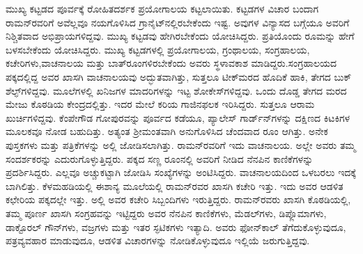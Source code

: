 ಮುಖ್ಯ ಕಟ್ಟಡದ ಪೂರ್ವಕ್ಕೆ ರೋಹಿತದರ್ಶಕ ಪ್ರಯೋಗಾಲಯ ಕಟ್ಟಲಾಯಿತು. ಕಟ್ಟಡಗಳ ವಿಚಾರ ಬಂದಾಗ ರಾಮನ್‍ರವರಿಗೆ ಅವೆಲ್ಲವೂ ನಯಗೊಳಿಸಿದ ಗ್ರಾನೈಟ್‍ನಲ್ಲಿರಬೇಕೆಂದು ಇಷ್ಟ. ಅವುಗಳ ವಿನ್ಯಾಸದ ಬಗ್ಗೆಯೂ ಅವರಿಗೆ ನಿಶ್ಚಿತವಾದ ಅಭಿಪ್ರಾಯಗಳಿದ್ದವು. ಮುಖ್ಯ ಕಟ್ಟಡವು ಹೇಗಿರಬೇಕೆಂದು ಯೋಚಿಸಿದ್ದರು. ಪ್ರತಿಯೊಂದು ರೂಮನ್ನು ಹೇಗೆ ಬಳಸಬೇಕೆಂದು ಯೋಚಿಸಿದ್ದರು. ಮುಖ್ಯ ಕಟ್ಟಡಗಳಲ್ಲಿ ಪ್ರಯೋಗಾಲಯ, ಗ್ರಂಥಾಲಯ, ಸಂಗ್ರಹಾಲಯ, ಕಚೇರಿಗಳು,\break ವಾಚನಾಲಯ ಮತ್ತು ಬಾತ್‍ರೂಂಗಳಿರಬೇಕೆಂದು ಅವರು ಸ್ಥಳಾವಕಾಶ ಮಾಡಿದ್ದರು.\break ಸಂಗ್ರಹಾಲಯದ ಪಕ್ಕದಲ್ಲಿದ್ದ ಅವರ ಖಾಸಗಿ ವಾಚನಾಲಯವು ಅದ್ಭುತವಾಗಿತ್ತು, ಸುತ್ತಲೂ ಟೀಕ್\-‍ಮರದ ಹೊದಿಕೆ ಹಾಕಿ, ತೇಗದ ಬುಕ್ ಶೆಲ್ಫ್‌ಗಳಿದ್ದವು. ಮೂಲೆಗಳಲ್ಲಿ ಖನಿಜಗಳ ಮಾದರಿಗಳನ್ನು ಇಟ್ಟ ಶೋಕೇಸ್‍ಗಳಿದ್ದವು. ಒಂದು ದೊಡ್ಡ ತೇಗದ ಮರದ ಮೇಜು ಕೊಠಡಿಯ ಕೇಂದ್ರದಲ್ಲಿತ್ತು. ಇದರ ಮೇಲೆ ಕರಿಯ ಗಾಜಿನಫಲಕ ಇರಿಸಿದ್ದರು. ಸುತ್ತಲೂ ಆರಾಮ ಖುರ್ಚಿಗಳಿದ್ದವು. ಕೆಂಪೇಗೌಡ ಗೋಪುರವನ್ನು ಪೂರ್ವದ ಕಡೆಯೂ, ಪ್ಯಾಲೇಸ್ ಗಾರ್ಡ್‌ನ್‍ಗಳನ್ನು ದಕ್ಷಿಣದ ಕಿಟಕಿಗಳ ಮೂಲಕವೂ ನೋಡ ಬಹುದಿತ್ತು. ಅತ್ಯಂತ ಶ‍್ರೀಮಂತವಾಗಿ ಅನುಗೊಳಿಸಿದ ಚೆಂದವಾದ ರೂಂ ಆಗಿತ್ತು. ಅನೇಕ ಪುಸ್ತಕಗಳು ಮತ್ತು ಪತ್ರಿಕೆಗಳನ್ನು ಅಲ್ಲಿ ಜೋಡಿಸಲಾಗಿತ್ತು. ರಾಮನ್‍ರವರಿಗೆ ಇದು ವಾಚನಾಲಯ. ಅಲ್ಲೇ ಅವರು ತಮ್ಮ ಸಂದರ್ಶಕರನ್ನು ಎದುರುಗೊಳ್ಳುತ್ತಿದ್ದರು. ಪಕ್ಕದ ಸಣ್ಣ ರೂಂನಲ್ಲಿ ಅವರಿಗೆ ನೀಡಿದ ನೆನಪಿನ ಕಾಣಿಕೆಗಳನ್ನು ಪ್ರದರ್ಶಿಸಿದ್ದರು. ಎಲ್ಲವೂ ಅಚ್ಚುಕಟ್ಟಾಗಿ ಜೋಡಿಸಿ ಸಂಖ್ಯೆಗಳನ್ನು ಅಂಟಿಸಿದ್ದರು. ವಾಚನಾಲಯದಿಂದ ಒಳಬರಲು ಇದಕ್ಕೆ ಬಾಗಿಲಿತ್ತು. ಕೆಳಮಹಡಿಯಲ್ಲಿ ಈಶಾನ್ಯ ಮೂಲೆಯಲ್ಲಿ ರಾಮನ್‍ರವರ ಖಾಸಗಿ ಕಚೇರಿ ಇತ್ತು. ಇದು ಅವರ ಆಡಳಿತ ಕಛೇರಿಯ ಪಕ್ಕದಲ್ಲೇ ಇತ್ತು. ಅಲ್ಲಿ ಅವರ ಕಚೇರಿ ಸಿಬ್ಬಂದಿಗಳು ಇರುತ್ತಿದ್ದರು. ರಾಮನ್‍ರವರು ಖಾಸಗಿ ಕೊಠಡಿಯಲ್ಲಿ, ತಮ್ಮ ಪೂರ್ಣ ಖಾಸಗಿ ಸಂಗ್ರಹವನ್ನು ಇಟ್ಟಿದ್ದರು  ಅವರ ನೆನಪಿನ ಕಾಣಿಕೆಗಳು, ಮೆಡಲ್‍ಗಳು, ಡಿಪ್ಲೊಮಾಗಳು, ಡಾಕ್ಟೊರಲ್ ಗೌನ್‍ಗಳು, ವಜ್ರಗಳು ಮತ್ತು ಇತರ ಸ್ಫಟಿಕಗಳು ಇತ್ಯಾದಿ. ಅವರು ಫೋನ್‍ಕಾಲ್ ತೆಗೆದುಕೊಳ್ಳುವುದೂ, ಪತ್ರವ್ಯವಹಾರ ಮಾಡುವುದೂ, ಆಡಳಿತ ವಿಚಾರಗಳನ್ನು ನೋಡಿಕೊಳ್ಳುವುದೂ ಇಲ್ಲಿಯೆ ಜರುಗುತ್ತಿದ್ದವು.

